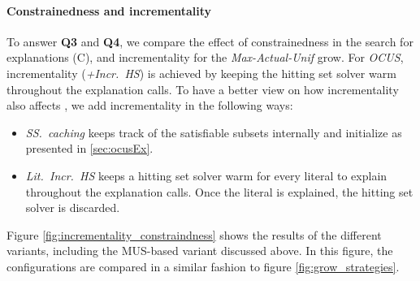\paragraph{Constrainedness and incrementality}
To answer \textbf{Q3} and \textbf{Q4}, we compare the effect of constrainedness in the search for explanations (C), and incrementality for the \emph{Max-Actual-Unif} grow.
For \emph{OCUS}, incrementality (\emph{+Incr.~HS}) is achieved by keeping the hitting set solver warm throughout the explanation calls.  
To have a better view on how incrementality also affects \omus, we add incrementality in the following ways:
\begin{itemize}
	\item \emph{SS.~caching} keeps track of the satisfiable subsets internally and initialize \setstohit as presented in \cref{sec:ocusEx}.
	\item \emph{Lit.~Incr.~HS} keeps a hitting set solver warm for every literal to explain throughout the explanation calls. Once the literal is explained, the hitting set solver is discarded.
\end{itemize}
% 
Figure \ref{fig:incrementality_constraindness} shows the results of the different variants, including the MUS-based variant discussed above. 
In this figure, the configurations are compared in a similar fashion to figure \ref{fig:grow_strategies}.

